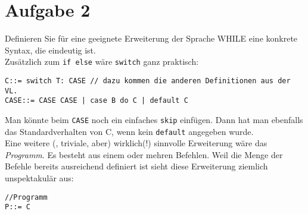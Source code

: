 \documentclass[ngerman,a4paper]{report}
\begin{document}
\section*{Aufgabe 2}
Definieren Sie für eine geeignete Erweiterung der Sprache WHILE eine konkrete Syntax, die eindeutig ist.\\
Zusätzlich zum \lstinline!if else! wäre \lstinline!switch! ganz praktisch:
\begin{lstlisting}
C::= switch T: CASE // dazu kommen die anderen Definitionen aus der VL.
CASE::= CASE CASE | case B do C | default C
\end{lstlisting}
Man könnte beim \lstinline!CASE! noch ein einfaches \lstinline!skip! einfügen. Dann hat man ebenfalls das Standardverhalten von C, wenn kein \lstinline!default! angegeben wurde.\\
Eine weitere (, triviale, aber) wirklich(!) sinnvolle Erweiterung wäre das \emph{Programm}. Es besteht aus einem oder mehren Befehlen. Weil die Menge der Befehle bereits ausreichend definiert ist sieht diese Erweiterung ziemlich unspektakulär aus:
\begin{lstlisting}
//Programm
P::= C 
\end{lstlisting}
\end{document}
